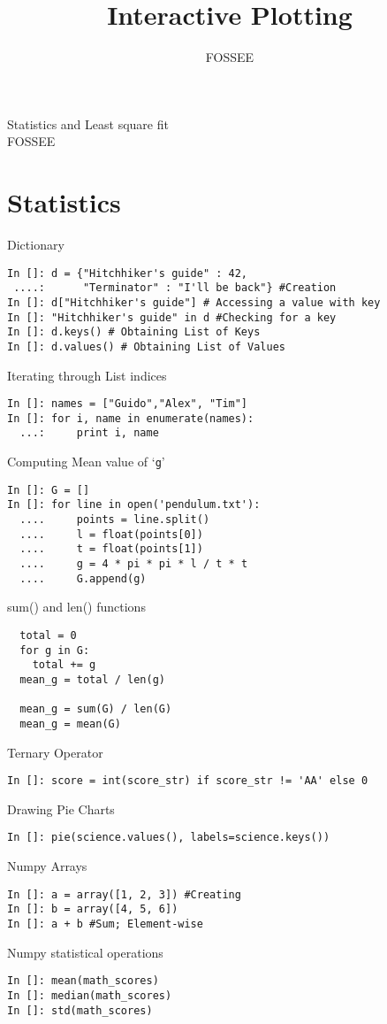 \documentclass[12pt]{article}
\title{Interactive Plotting}
\author{FOSSEE}
\begin{document}
\date{}
\vspace{-1in}
\begin{center}
\LARGE{Statistics and Least square fit}\\
\large{FOSSEE}
\end{center}
\section{Statistics}
Dictionary
\begin{lstlisting}
In []: d = {"Hitchhiker's guide" : 42, 
 ....:      "Terminator" : "I'll be back"} #Creation
In []: d["Hitchhiker's guide"] # Accessing a value with key
In []: "Hitchhiker's guide" in d #Checking for a key
In []: d.keys() # Obtaining List of Keys
In []: d.values() # Obtaining List of Values
\end{lstlisting}
Iterating through List indices
\begin{lstlisting}
In []: names = ["Guido","Alex", "Tim"]
In []: for i, name in enumerate(names):
  ...:     print i, name
\end{lstlisting}
Computing Mean value of `\texttt{g}'
\begin{lstlisting}
In []: G = []
In []: for line in open('pendulum.txt'):
  ....     points = line.split()
  ....     l = float(points[0])
  ....     t = float(points[1])
  ....     g = 4 * pi * pi * l / t * t
  ....     G.append(g)
\end{lstlisting}
sum() and len() functions
\begin{lstlisting}
  total = 0
  for g in G:
    total += g
  mean_g = total / len(g)

  mean_g = sum(G) / len(G)
  mean_g = mean(G)
\end{lstlisting}
\newpage
Ternary Operator
\begin{lstlisting}
In []: score = int(score_str) if score_str != 'AA' else 0
\end{lstlisting}
Drawing Pie Charts
\begin{lstlisting}
In []: pie(science.values(), labels=science.keys())
\end{lstlisting}
Numpy Arrays
\begin{lstlisting}
In []: a = array([1, 2, 3]) #Creating
In []: b = array([4, 5, 6])
In []: a + b #Sum; Element-wise
\end{lstlisting}
Numpy statistical operations 
\begin{lstlisting}
In []: mean(math_scores)
In []: median(math_scores)
In []: std(math_scores)
\end{lstlisting}
\end{document}
